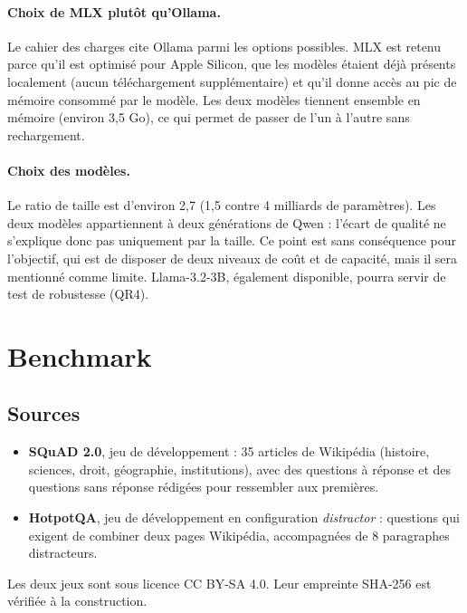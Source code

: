 \documentclass[11pt,a4paper]{article}
\begin{document}
\paragraph{Choix de MLX plutôt qu'Ollama.} Le cahier des charges cite Ollama parmi les options
possibles. MLX est retenu parce qu'il est optimisé pour Apple Silicon, que les modèles étaient déjà
présents localement (aucun téléchargement supplémentaire) et qu'il donne accès au pic de mémoire
consommé par le modèle. Les deux modèles tiennent ensemble en mémoire (environ 3,5 Go), ce qui permet
de passer de l'un à l'autre sans rechargement.

\paragraph{Choix des modèles.} Le ratio de taille est d'environ 2,7 (1,5 contre 4 milliards de
paramètres). Les deux modèles appartiennent à deux générations de Qwen : l'écart de qualité ne
s'explique donc pas uniquement par la taille. Ce point est sans conséquence pour l'objectif, qui est
de disposer de deux niveaux de coût et de capacité, mais il sera mentionné comme limite. Llama-3.2-3B,
également disponible, pourra servir de test de robustesse (QR4).

\section{Benchmark}\label{sec:benchmark}

\subsection{Sources}
\begin{itemize}
\item \textbf{SQuAD 2.0}, jeu de développement \citep{rajpurkar2018squad2} : 35 articles de Wikipédia
(histoire, sciences, droit, géographie, institutions), avec des questions à réponse et des questions
sans réponse rédigées pour ressembler aux premières.
\item \textbf{HotpotQA}, jeu de développement en configuration \emph{distractor} \citep{yang2018hotpotqa} :
questions qui exigent de combiner deux pages Wikipédia, accompagnées de 8 paragraphes distracteurs.
\end{itemize}
Les deux jeux sont sous licence CC BY-SA 4.0. Leur empreinte SHA-256 est vérifiée à la construction.
\end{document}
